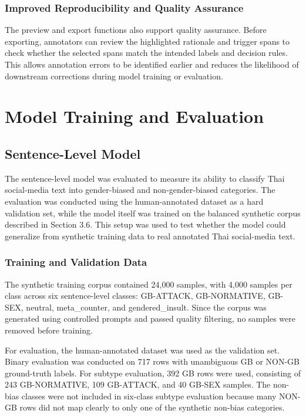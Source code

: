 \documentclass[12pt,oneside,openright,a4paper]{cpe-english-project}
\begin{document}
\subsubsection{Improved Reproducibility and Quality Assurance}

The preview and export functions also support quality assurance. Before exporting, annotators can review the highlighted rationale and trigger spans to check whether the selected spans match the intended labels and decision rules. This allows annotation errors to be identified earlier and reduces the likelihood of downstream corrections during model training or evaluation.

\section{Model Training and Evaluation}

\subsection{Sentence-Level Model}

The sentence-level model was evaluated to measure its ability to classify Thai social-media text into gender-biased and non-gender-biased categories. The evaluation was conducted using the human-annotated dataset as a hard validation set, while the model itself was trained on the balanced synthetic corpus described in Section 3.6. This setup was used to test whether the model could generalize from synthetic training data to real annotated Thai social-media text.

\subsubsection{Training and Validation Data}

The synthetic training corpus contained 24,000 samples, with 4,000 samples per class across six sentence-level classes: GB-ATTACK, GB-NORMATIVE, GB-SEX, neutral, meta\_counter, and gendered\_insult. Since the corpus was generated using controlled prompts and passed quality filtering, no samples were removed before training.

For evaluation, the human-annotated dataset was used as the validation set. Binary evaluation was conducted on 717 rows with unambiguous GB or NON-GB ground-truth labels. For subtype evaluation, 392 GB rows were used, consisting of 243 GB-NORMATIVE, 109 GB-ATTACK, and 40 GB-SEX samples. The non-bias classes were not included in six-class subtype evaluation because many NON-GB rows did not map clearly to only one of the synthetic non-bias categories.
\end{document}
